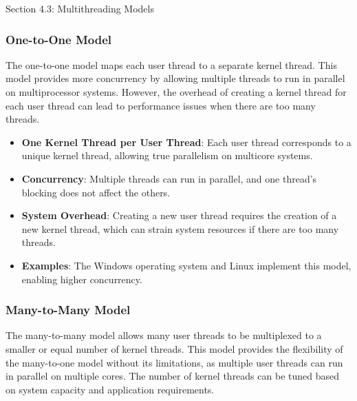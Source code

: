 \begin{notes}{Section 4.3: Multithreading Models}
\begin{highlight}
    \end{highlight}
    
    \subsubsection*{One-to-One Model}
    
    The one-to-one model maps each user thread to a separate kernel thread. This model provides more concurrency by allowing multiple threads to run in parallel on multiprocessor systems. However, the 
    overhead of creating a kernel thread for each user thread can lead to performance issues when there are too many threads.
    
    \begin{highlight}
    
        \begin{itemize}
            \item \textbf{One Kernel Thread per User Thread}: Each user thread corresponds to a unique kernel thread, allowing true parallelism on multicore systems.
            \item \textbf{Concurrency}: Multiple threads can run in parallel, and one thread’s blocking does not affect the others.
            \item \textbf{System Overhead}: Creating a new user thread requires the creation of a new kernel thread, which can strain system resources if there are too many threads.
            \item \textbf{Examples}: The Windows operating system and Linux implement this model, enabling higher concurrency.
        \end{itemize}
    
    \end{highlight}
    
    \subsubsection*{Many-to-Many Model}
    
    The many-to-many model allows many user threads to be multiplexed to a smaller or equal number of kernel threads. This model provides the flexibility of the many-to-one model without its limitations, 
    as multiple user threads can run in parallel on multiple cores. The number of kernel threads can be tuned based on system capacity and application requirements.
    
    \begin{highlight}
    

\end{highlight}
\end{notes}
